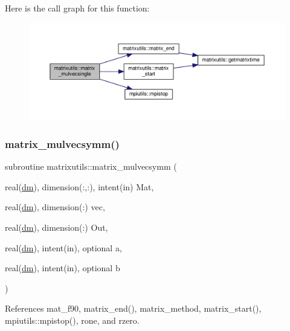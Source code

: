 Here is the call graph for this function\+:
\nopagebreak
\begin{figure}[H]
\begin{center}
\leavevmode
\includegraphics[width=350pt]{namespacematrixutils_a629395ae3092616dd7db4d401570ccd0_cgraph}
\end{center}
\end{figure}
\mbox{\label{namespacematrixutils_a4bcc2b4fc8b6f2fee0c142c280851c73}} 
\subsubsection{\texorpdfstring{matrix\+\_\+mulvecsymm()}{matrix\_mulvecsymm()}}
{\footnotesize\ttfamily subroutine matrixutils\+::matrix\+\_\+mulvecsymm (\begin{DoxyParamCaption}\item[{real(\mbox{\hyperlink{namespacematrixutils_a7bdc564986ea4d90f51201c75606ef3d}{dm}}), dimension(\+:,\+:), intent(in)}]{Mat,  }\item[{real(\mbox{\hyperlink{namespacematrixutils_a7bdc564986ea4d90f51201c75606ef3d}{dm}}), dimension(\+:)}]{vec,  }\item[{real(\mbox{\hyperlink{namespacematrixutils_a7bdc564986ea4d90f51201c75606ef3d}{dm}}), dimension(\+:)}]{Out,  }\item[{real(\mbox{\hyperlink{namespacematrixutils_a7bdc564986ea4d90f51201c75606ef3d}{dm}}), intent(in), optional}]{a,  }\item[{real(\mbox{\hyperlink{namespacematrixutils_a7bdc564986ea4d90f51201c75606ef3d}{dm}}), intent(in), optional}]{b }\end{DoxyParamCaption})}



References mat\+\_\+f90, matrix\+\_\+end(), matrix\+\_\+method, matrix\+\_\+start(), mpiutils\+::mpistop(), rone, and rzero.




